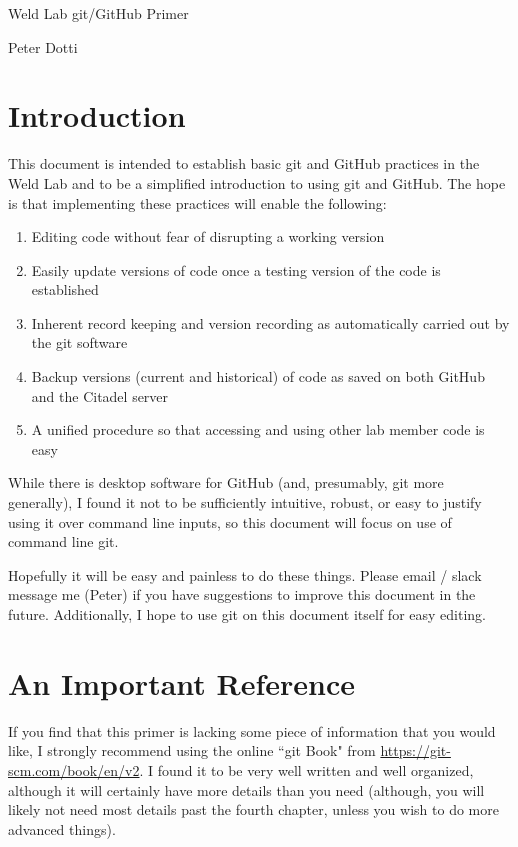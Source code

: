 \documentclass[11pt]{article}
\begin{document}
\begin{center}
{\Large Weld Lab git/GitHub Primer}

Peter Dotti
\end{center}

\section{Introduction}

This document is intended to establish basic git and GitHub practices in the Weld Lab and to be a simplified introduction to using git and GitHub.  The hope is that implementing these practices will enable the following:

\begin{enumerate}
\item Editing code without fear of disrupting a working version
\item Easily update versions of code once a testing version of the code is established
\item Inherent record keeping and version recording as automatically carried out by the git software
\item Backup versions (current and historical) of code as saved on both GitHub and the Citadel server
\item A unified procedure so that accessing and using other lab member code is easy
\end{enumerate}

While there is desktop software for GitHub (and, presumably, git more generally), I found it not to be sufficiently intuitive, robust, or easy to justify using it over command line inputs, so this document will focus on use of command line git.

Hopefully it will be easy and painless to do these things.  Please email / slack message me (Peter) if you have suggestions to improve this document in the future.  Additionally, I hope to use git on this document itself for easy editing.

\section{An Important Reference}

If you find that this primer is lacking some piece of information that you would like, I strongly recommend using the online ``git Book" from \url{https://git-scm.com/book/en/v2}.  I found it to be very well written and well organized, although it will certainly have more details than you need (although, you will likely not need most details past the fourth chapter, unless you wish to do more advanced things).
\end{document}
